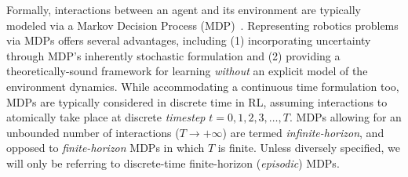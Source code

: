 Formally, interactions between an agent and its environment are typically modeled via a Markov Decision Process (MDP)~\citep{bellmanMarkovianDecisionProcess1957}.
Representing robotics problems via MDPs offers several advantages, including (1) incorporating uncertainty through MDP's inherently stochastic formulation and (2) providing a theoretically-sound framework for learning \emph{without} an explicit model of the environment dynamics.
While accommodating a continuous time formulation too, MDPs are typically considered in discrete time in RL, assuming interactions to atomically take place at discrete \emph{timestep} \( t=0,1,2,3, \dots, T \).
MDPs allowing for an unbounded number of interactions (\( T \to + \infty \)) are termed \emph{infinite-horizon}, and opposed to \emph{finite-horizon} MDPs in which \( T \) is finite.
Unless diversely specified, we will only be referring to discrete-time finite-horizon (\emph{episodic}) MDPs.

